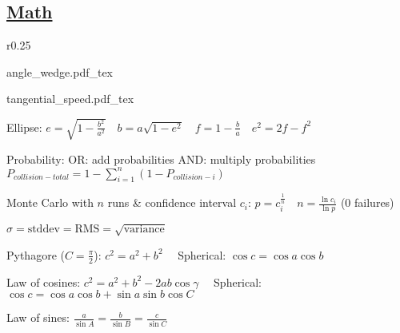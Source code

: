 \documentclass[11pt,landscape]{article}
\begin{document}
\linespread{2}
\raggedright
\footnotesize

\setlength{\premulticols}{1pt}
\setlength{\postmulticols}{1pt}
\setlength{\multicolsep}{1pt}
\setlength{\columnsep}{2pt}



\newcommand{\norm}[1]{\left\lVert #1 \right\rVert}

\makeatletter
\newcommand*\dotp{\mathpalette\dotp@{.5}}
\newcommand*\dotp@[2]{\mathbin{\vcenter{\hbox{\scalebox{#2}{$\m@th#1\bullet$}}}}}
\makeatother


\newpage
\subsection{\underline{Math}}

\begin{wrapfigure}{r}{0.25\textwidth}

\quad

{angle_wedge.pdf_tex}

\quad

{tangential_speed.pdf_tex}
\end{wrapfigure}

Ellipse:
$
e = \sqrt{1-\frac{b^2}{a^2}}
\quad
b = a\sqrt{1-e^2}
\quad
f = 1 - \frac{b}{a}
\quad
e^2 = 2f - f^2
$

Probability: 
OR: add probabilities
AND: multiply probabilities
$P_{collision-total} = 1 - \sum_{i=1}^{n}(1-P_{collision-i})$

Monte Carlo with $n$ runs \& confidence interval $c_i$:
$p = c_i^{\frac{1}{n}} \quad n = \frac{\ln c_i}{\ln p}$ (0 failures)

$
\sigma
= \text{stddev}
= \text{RMS}
= \sqrt{\text{variance}}
$

Pythagore ($C=\frac{\pi}{2}$):
$c^2 = a^2 + b^2
\quad$
Spherical:
$\cos{c} = \cos{a}\cos{b}$

Law of cosines:
$
c^2 = a^2 + b^2 - 2ab\cos{\gamma}
\quad
$
Spherical:
$
\cos{c} = \cos{a}\cos{b} + \sin{a}\sin{b}\cos{C}
$

Law of sines:
$
\frac{a}{\sin{A}} =
\frac{b}{\sin{B}} =
\frac{c}{\sin{C}}
$
\end{document}
